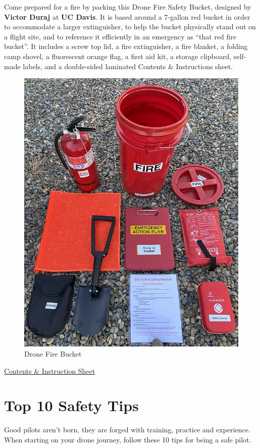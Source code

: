 \documentclass[
  12pt,
]{book}
\begin{document}
Come prepared for a fire by packing this Drone Fire Safety Bucket, designed by \textbf{Victor Duraj} at \textbf{UC Davis}. It is based around a 7-gallon red bucket in order to accommodate a larger extinguisher, to help the bucket physically stand out on a flight site, and to reference it efficiently in an emergency as ``that red fire bucket''. It includes a screw top lid, a fire extinguisher, a fire blanket, a folding camp shovel, a fluorescent orange flag, a first aid kit, a storage clipboard, self-made labels, and a double-sided laminated Contents \& Instructions sheet.

\begin{figure}

{\centering \includegraphics[width=0.75\linewidth]{images/DroneFireBucket} 

}

\caption{Drone Fire Bucket}\label{fig:fire-bucket}
\end{figure}

\href{https://ucdrones.github.io/library/drone_fire_safety_bucket.docx}{Contents \& Instruction Sheet}

\hypertarget{tips}{%
\section{Top 10 Safety Tips}\label{tips}}

Good pilots aren't born, they are forged with training, practice and experience. When starting on your drone journey, follow these 10 tips for being a safe pilot.
\end{document}

